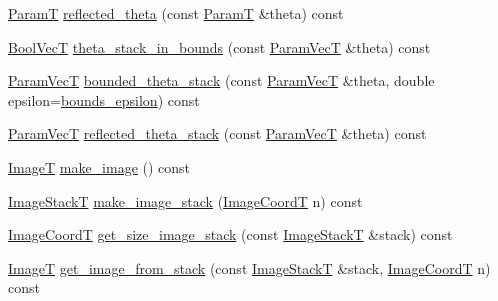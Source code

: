 \begin{DoxyCompactItemize}
\item 
\hyperlink{classmappel_1_1PointEmitterModel_a665ec6aea3aac139bb69a23c06d4b9a1}{ParamT} \hyperlink{classmappel_1_1PointEmitterModel_a7dd386776870462e8f20c646b6fed1e3}{reflected\+\_\+theta} (const \hyperlink{classmappel_1_1PointEmitterModel_a665ec6aea3aac139bb69a23c06d4b9a1}{ParamT} \&theta) const 
\item 
\hyperlink{namespacemappel_a167d761ecce3cafb6f98c00c16bdb523}{Bool\+VecT} \hyperlink{classmappel_1_1PointEmitterModel_a7b6a59b4bc796b440025cffb7a6159f8}{theta\+\_\+stack\+\_\+in\+\_\+bounds} (const \hyperlink{classmappel_1_1PointEmitterModel_add253b568d763f1513a810aac35de719}{Param\+VecT} \&theta) const 
\item 
\hyperlink{classmappel_1_1PointEmitterModel_add253b568d763f1513a810aac35de719}{Param\+VecT} \hyperlink{classmappel_1_1PointEmitterModel_a6671c06d391ae9a09dd5de78dcc636fe}{bounded\+\_\+theta\+\_\+stack} (const \hyperlink{classmappel_1_1PointEmitterModel_add253b568d763f1513a810aac35de719}{Param\+VecT} \&theta, double epsilon=\hyperlink{classmappel_1_1PointEmitterModel_ac987a119137b85a27704b1c40e3fab8c}{bounds\+\_\+epsilon}) const 
\item 
\hyperlink{classmappel_1_1PointEmitterModel_add253b568d763f1513a810aac35de719}{Param\+VecT} \hyperlink{classmappel_1_1PointEmitterModel_ae24c17017ff5e37e1dd9ea9a1aeefa7f}{reflected\+\_\+theta\+\_\+stack} (const \hyperlink{classmappel_1_1PointEmitterModel_add253b568d763f1513a810aac35de719}{Param\+VecT} \&theta) const 
\item 
\hyperlink{classmappel_1_1ImageFormat1DBase_a521a1ff391a52a636fac4aac7c7ba02c}{ImageT} \hyperlink{classmappel_1_1ImageFormat1DBase_afa59b2dd9ba997262fa17ef7d1122996}{make\+\_\+image} () const 
\item 
\hyperlink{classmappel_1_1ImageFormat1DBase_a81e3246d1c5c37ebf9077b7b5bd25a76}{Image\+StackT} \hyperlink{classmappel_1_1ImageFormat1DBase_ab2c4470c335a6abb2d3b9c442339ca0c}{make\+\_\+image\+\_\+stack} (\hyperlink{classmappel_1_1ImageFormat1DBase_a82ab3168eb1a87eaeb3e7c919188e9fc}{Image\+CoordT} n) const 
\item 
\hyperlink{classmappel_1_1ImageFormat1DBase_a82ab3168eb1a87eaeb3e7c919188e9fc}{Image\+CoordT} \hyperlink{classmappel_1_1ImageFormat1DBase_afa0e79b58955f5ecfd39c8f8d06f22ad}{get\+\_\+size\+\_\+image\+\_\+stack} (const \hyperlink{classmappel_1_1ImageFormat1DBase_a81e3246d1c5c37ebf9077b7b5bd25a76}{Image\+StackT} \&stack) const 
\item 
\hyperlink{classmappel_1_1ImageFormat1DBase_a521a1ff391a52a636fac4aac7c7ba02c}{ImageT} \hyperlink{classmappel_1_1ImageFormat1DBase_a92d3d803a82402adcca516b53e8d5100}{get\+\_\+image\+\_\+from\+\_\+stack} (const \hyperlink{classmappel_1_1ImageFormat1DBase_a81e3246d1c5c37ebf9077b7b5bd25a76}{Image\+StackT} \&stack, \hyperlink{classmappel_1_1ImageFormat1DBase_a82ab3168eb1a87eaeb3e7c919188e9fc}{Image\+CoordT} n) const 

\end{DoxyCompactItemize}
